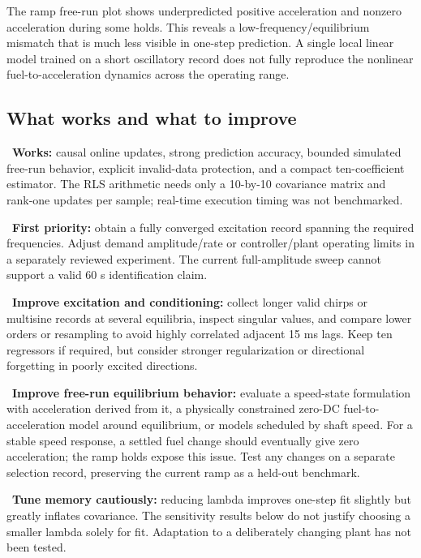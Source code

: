 The ramp free-run plot shows underpredicted positive acceleration and nonzero acceleration during some holds. This reveals a low-frequency/equilibrium mismatch that is much less visible in one-step prediction. A single local linear model trained on a short oscillatory record does not fully reproduce the nonlinear fuel-to-acceleration dynamics across the operating range.

\subsection{What works and what to improve}

\par\noindent\textbullet\ \textbf{Works:} causal online updates, strong prediction accuracy, bounded simulated free-run behavior, explicit invalid-data protection, and a compact ten-coefficient estimator. The RLS arithmetic needs only a 10-by-10 covariance matrix and rank-one updates per sample; real-time execution timing was not benchmarked.
\par\noindent\textbullet\ \textbf{First priority:} obtain a fully converged excitation record spanning the required frequencies. Adjust demand amplitude/rate or controller/plant operating limits in a separately reviewed experiment. The current full-amplitude sweep cannot support a valid 60 s identification claim.
\par\noindent\textbullet\ \textbf{Improve excitation and conditioning:} collect longer valid chirps or multisine records at several equilibria, inspect singular values, and compare lower orders or resampling to avoid highly correlated adjacent 15 ms lags. Keep ten regressors if required, but consider stronger regularization or directional forgetting in poorly excited directions.
\par\noindent\textbullet\ \textbf{Improve free-run equilibrium behavior:} evaluate a speed-state formulation with acceleration derived from it, a physically constrained zero-DC fuel-to-acceleration model around equilibrium, or models scheduled by shaft speed. For a stable speed response, a settled fuel change should eventually give zero acceleration; the ramp holds expose this issue. Test any changes on a separate selection record, preserving the current ramp as a held-out benchmark.
\par\noindent\textbullet\ \textbf{Tune memory cautiously:} reducing lambda improves one-step fit slightly but greatly inflates covariance. The sensitivity results below do not justify choosing a smaller lambda solely for fit. Adaptation to a deliberately changing plant has not been tested.
